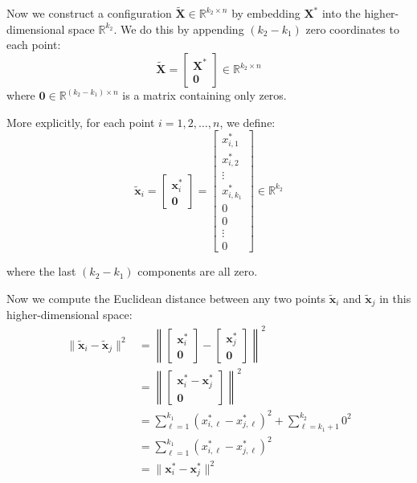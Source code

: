\documentclass[a4paper]{scrartcl}
\begin{document}
Now we construct a configuration $\tilde{\mathbf{X}} \in \mathbb{R}^{k_2 \times n}$ by embedding $\mathbf{X}^*$ into the higher-dimensional space $\mathbb{R}^{k_2}$. We do this by appending $(k_2 - k_1)$ zero coordinates to each point:
$$\tilde{\mathbf{X}} = \begin{bmatrix} \mathbf{X}^* \\ \mathbf{0} \end{bmatrix} \in \mathbb{R}^{k_2 \times n}$$
where $\mathbf{0} \in \mathbb{R}^{(k_2 - k_1) \times n}$ is a matrix containing only zeros.

More explicitly, for each point $i = 1, 2, \ldots, n$, we define:
$$\tilde{\mathbf{x}}_i = \begin{bmatrix} \mathbf{x}_i^* \\ \mathbf{0} \end{bmatrix} = \begin{bmatrix} x_{i,1}^* \\ x_{i,2}^* \\ \vdots \\ x_{i,k_1}^* \\ 0 \\ 0 \\ \vdots \\ 0 \end{bmatrix} \in \mathbb{R}^{k_2}$$

where the last $(k_2 - k_1)$ components are all zero.

Now we compute the Euclidean distance between any two points $\tilde{\mathbf{x}}_i$ and $\tilde{\mathbf{x}}_j$ in this higher-dimensional space:
\begin{align*}
\|\tilde{\mathbf{x}}_i - \tilde{\mathbf{x}}_j\|^2 &= \left\|\begin{bmatrix} \mathbf{x}_i^* \\ \mathbf{0} \end{bmatrix} - \begin{bmatrix} \mathbf{x}_j^* \\ \mathbf{0} \end{bmatrix}\right\|^2 \\
&= \left\|\begin{bmatrix} \mathbf{x}_i^* - \mathbf{x}_j^* \\ \mathbf{0} \end{bmatrix}\right\|^2 \\
&= \sum_{\ell=1}^{k_1} (x_{i,\ell}^* - x_{j,\ell}^*)^2 + \sum_{\ell=k_1+1}^{k_2} 0^2 \\
&= \sum_{\ell=1}^{k_1} (x_{i,\ell}^* - x_{j,\ell}^*)^2 \\
&= \|\mathbf{x}_i^* - \mathbf{x}_j^*\|^2
\end{align*}
\end{document}
